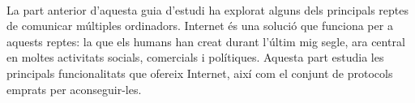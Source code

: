 \ \\[-10cm]
La part anterior d'aquesta guia d'estudi ha explorat alguns dels principals reptes de comunicar múltiples ordinadors.
Internet és una solució que funciona per a aquests reptes: la que els humans han creat durant l'últim mig segle,
ara central en moltes activitats socials, comercials i polítiques.
%
Aquesta part estudia les principals funcionalitats que ofereix Internet, així com el conjunt de protocols
emprats per aconseguir-les.

